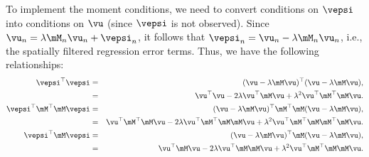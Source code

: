 \documentclass[english,12pt]{book}\usepackage[]{graphicx}\usepackage[]{xcolor}
\begin{document}
To implement the moment conditions, we need to convert conditions on $\vepsi$ into conditions on $\vu$ (since $\vepsi$ is not observed). Since $\vu_n = \lambda \mM_n\vu_n + \vepsi_n$, it follows that $\vepsi_n = \vu_n - \lambda\mM_n\vu_n$, i.e., the spatially filtered regression error terms. Thus, we have the following relationships:
\begin{eqnarray}
\vepsi^\top \vepsi & = & (\vu - \lambda\mM\vu)^\top(\vu - \lambda\mM\vu), \nonumber \\ 
                   & = & \vu^\top\vu - 2\lambda\vu^\top\mM\vu + \lambda^2\vu^\top\mM^\top\mM\vu \label{eq:mom_1}.\\
\vepsi^\top \mM^\top\mM \vepsi& = &(\vu - \lambda\mM\vu)^\top\mM^\top\mM(\vu - \lambda\mM\vu), \nonumber \\
                   &= & \vu^\top\mM^\top\mM\vu - 2\lambda\vu^\top\mM^\top\mM\mM\vu + \lambda^2\vu^\top\mM^\top\mM\mM^\top\mM\vu. \label{eq:mom_2} \\
\vepsi^\top\mM \vepsi& = &(\vu - \lambda\mM\vu)^\top\mM(\vu - \lambda\mM\vu), \nonumber \\ 
                   &=& \vu^\top\mM\vu - 2\lambda\vu^\top\mM\mM\vu + \lambda^2\vu^\top\mM^\top\mM\mM\vu. \label{eq:mom_3}
\end{eqnarray}
\end{document}
